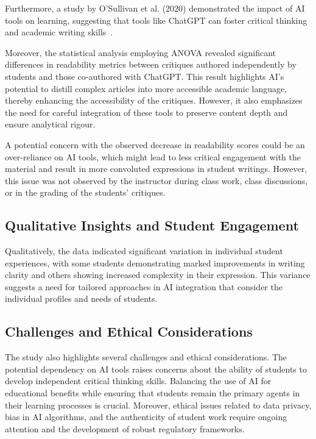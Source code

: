 Furthermore, a study by O'Sullivan et al. (2020) demonstrated the impact of AI tools on learning, suggesting that tools like ChatGPT can foster critical thinking and academic writing skills~\cite{osullivan_2020_collaborating}.

Moreover, the statistical analysis employing ANOVA revealed significant differences in readability metrics between critiques authored independently by students and those co-authored with ChatGPT. This result highlights AI's potential to distill complex articles into more accessible academic language, thereby enhancing the accessibility of the critiques. However, it also emphasizes the need for careful integration of these tools to preserve content depth and ensure analytical rigour.

A potential concern with the observed decrease in readability scores could be an over-reliance on AI tools, which might lead to less critical engagement with the material and result in more convoluted expressions in student writings. However, this issue was not observed by the instructor during class work, class discussions, or in the grading of the students’ critiques.

\subsection{Qualitative Insights and Student Engagement}
Qualitatively, the data indicated significant variation in individual student experiences, with some students demonstrating marked improvements in writing clarity and others showing increased complexity in their expression. This variance suggests a need for tailored approaches in AI integration that consider the individual profiles and needs of students.

\subsection{Challenges and Ethical Considerations}
The study also highlights several challenges and ethical considerations. The potential dependency on AI tools raises concerns about the ability of students to develop independent critical thinking skills. Balancing the use of AI for educational benefits while ensuring that students remain the primary agents in their learning processes is crucial. Moreover, ethical issues related to data privacy, bias in AI algorithms, and the authenticity of student work require ongoing attention and the development of robust regulatory frameworks.

